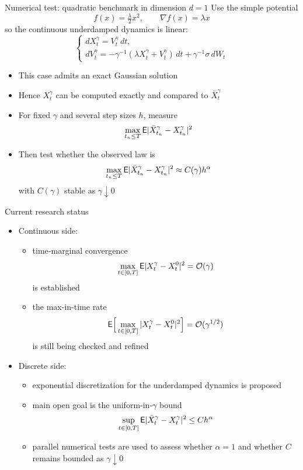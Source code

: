 \documentclass{beamer}
\newcommand{\<}{\langle}
\renewcommand{\>}{\rangle}
\begin{document}
\begin{frame}{Numerical test: quadratic benchmark in dimension $d=1$}
    Use the simple potential
    \[
    f(x)=\tfrac{\lambda}{2}x^2,\qquad \nabla f(x)=\lambda x
    \]
    so the continuous underdamped dynamics is linear:
    \[
    \begin{cases}
    dX_t^\gamma=V_t^\gamma\,dt,\\
    dV_t^\gamma=-\gamma^{-1}(\lambda X_t^\gamma+V_t^\gamma)\,dt
    +\gamma^{-1}\sigma\,dW_t
    \end{cases}
    \]
    \begin{itemize}
        \item This case admits an exact Gaussian solution
        \item Hence $X_t^\gamma$ can be computed exactly and compared to $\bar X_t^\gamma$
        \item For fixed $\gamma$ and several step sizes $h$, measure
        \[
        \max_{t_n\le T}{\mathsf E}|\bar X_{t_n}^\gamma-X_{t_n}^\gamma|^2
        \]
        \item Then test whether the observed law is
        \[
        \max_{t_n\le T}{\mathsf E}|\bar X_{t_n}^\gamma-X_{t_n}^\gamma|^2
        \approx C(\gamma)h^\alpha
        \]
        with $C(\gamma)$ stable as $\gamma\downarrow0$
    \end{itemize}
\end{frame}

\begin{frame}{Current research status}
    \begin{itemize}
        \item \textcolor{mygreen}{Continuous side:}
        \begin{itemize}
            \item time-marginal convergence
            \[
            \max_{t\in[0,T]}{\mathsf E}|X_t^\gamma-X_t^0|^2=\mathcal{O}(\gamma)
            \]
            is established
            \item the max-in-time rate
            \textcolor{lightgray}{
            \[
            {\mathsf E}\Big[\max_{t\in[0,T]}|X_t^\gamma-X_t^0|^2\Big]=\mathcal{O}(\gamma^{1/2})
            \]
            }
            is still being checked and refined
        \end{itemize}
        \bigskip
        \item \textcolor{mygreen}{Discrete side:}
        \begin{itemize}
            \item exponential discretization for the underdamped dynamics is proposed
            \item main open goal is the uniform-in-$\gamma$ bound
            \[
            \sup_{t\in[0,T]}{\mathsf E}|\bar X_t^\gamma-X_t^\gamma|^2\le Ch^\alpha
            \]
            \item parallel numerical tests are used to assess whether $\alpha=1$ and whether $C$ remains bounded as $\gamma\downarrow0$
        \end{itemize}
    \end{itemize}
\end{frame}
\end{document}
